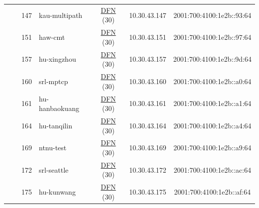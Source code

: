 \begin{small}
\begin{center}
\begin{longtable}{|c|c|c|c|c|c|c|c|}
  &  & \tiny{147} & \multicolumn{1}{|l|}{\tiny{kau-multipath}} & \multicolumn{2}{|c|}{\tiny{\href{https://www.dfn.de}{DFN} (30)}} & \tiny{10.30.43.147} & \tiny{2001:700:4100:1e2b::93:64} \\* \cline{3-3}\cline{4-4}\cline{5-5}\cline{6-6}\cline{7-7}\cline{8-8}
  &  & \tiny{151} & \multicolumn{1}{|l|}{\tiny{haw-cmt}} & \multicolumn{2}{|c|}{\tiny{\href{https://www.dfn.de}{DFN} (30)}} & \tiny{10.30.43.151} & \tiny{2001:700:4100:1e2b::97:64} \\* \cline{3-3}\cline{4-4}\cline{5-5}\cline{6-6}\cline{7-7}\cline{8-8}
  &  & \tiny{157} & \multicolumn{1}{|l|}{\tiny{hu-xingzhou}} & \multicolumn{2}{|c|}{\tiny{\href{https://www.dfn.de}{DFN} (30)}} & \tiny{10.30.43.157} & \tiny{2001:700:4100:1e2b::9d:64} \\* \cline{3-3}\cline{4-4}\cline{5-5}\cline{6-6}\cline{7-7}\cline{8-8}
  &  & \tiny{160} & \multicolumn{1}{|l|}{\tiny{srl-mptcp}} & \multicolumn{2}{|c|}{\tiny{\href{https://www.dfn.de}{DFN} (30)}} & \tiny{10.30.43.160} & \tiny{2001:700:4100:1e2b::a0:64} \\* \cline{3-3}\cline{4-4}\cline{5-5}\cline{6-6}\cline{7-7}\cline{8-8}
  &  & \tiny{161} & \multicolumn{1}{|l|}{\tiny{hu-hanbaokuang}} & \multicolumn{2}{|c|}{\tiny{\href{https://www.dfn.de}{DFN} (30)}} & \tiny{10.30.43.161} & \tiny{2001:700:4100:1e2b::a1:64} \\* \cline{3-3}\cline{4-4}\cline{5-5}\cline{6-6}\cline{7-7}\cline{8-8}
  &  & \tiny{164} & \multicolumn{1}{|l|}{\tiny{hu-tanqilin}} & \multicolumn{2}{|c|}{\tiny{\href{https://www.dfn.de}{DFN} (30)}} & \tiny{10.30.43.164} & \tiny{2001:700:4100:1e2b::a4:64} \\* \cline{3-3}\cline{4-4}\cline{5-5}\cline{6-6}\cline{7-7}\cline{8-8}
  &  & \tiny{169} & \multicolumn{1}{|l|}{\tiny{ntnu-test}} & \multicolumn{2}{|c|}{\tiny{\href{https://www.dfn.de}{DFN} (30)}} & \tiny{10.30.43.169} & \tiny{2001:700:4100:1e2b::a9:64} \\* \cline{3-3}\cline{4-4}\cline{5-5}\cline{6-6}\cline{7-7}\cline{8-8}
  &  & \tiny{172} & \multicolumn{1}{|l|}{\tiny{srl-seattle}} & \multicolumn{2}{|c|}{\tiny{\href{https://www.dfn.de}{DFN} (30)}} & \tiny{10.30.43.172} & \tiny{2001:700:4100:1e2b::ac:64} \\* \cline{3-3}\cline{4-4}\cline{5-5}\cline{6-6}\cline{7-7}\cline{8-8}
  &  & \tiny{175} & \multicolumn{1}{|l|}{\tiny{hu-kunwang}} & \multicolumn{2}{|c|}{\tiny{\href{https://www.dfn.de}{DFN} (30)}} & \tiny{10.30.43.175} & \tiny{2001:700:4100:1e2b::af:64} \\* \cline{3-3}\cline{4-4}\cline{5-5}\cline{6-6}\cline{7-7}\cline{8-8}

\end{longtable}
\end{center}
\end{small}
